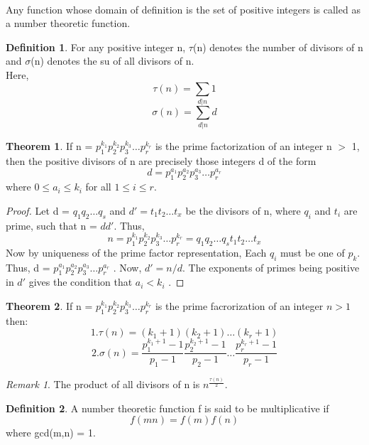 \documentclass[15,a4paper]{report}
\theoremstyle{definition}
\newtheorem{definition}{Definition}[section]
\newtheorem{theorem}{Theorem}[section]
\theoremstyle{remark}
\newtheorem*{remark}{Remark}
\begin{document}
        \paragraph{} Any function whose domain of definition is the set of positive integers is called as a number theoretic function. 
        \begin{definition}
            For any positive integer n, $\tau$(n) denotes the number of divisors of n and $\sigma$(n) denotes the su of all divisors of n.\\
            Here,
            \[ \tau(n) = \sum_{d|n} 1 \]
            \[ \sigma(n) = \sum_{d|n} d \]
        \end{definition}
        \begin{theorem}
            If n = $p_1^{k_1} p_2^{k_2} p_3^{k_3} \dots p_r^{k_r}$ is the prime factorization of an integer n $>$ 1, then the positive divisors of n are precisely those integers d of the form \[ d = p_1^{a_1} p_2^{a_2} p_3^{a_3} \dots p_r^{a_r} \] 
            where $0 \leq a_i \leq k_i$ for all $1 \leq i \leq r$.
        \end{theorem}
            \begin{proof}
                Let d = $q_1 q_2 \dots q_s$ and $d' = t_1 t_2 \dots t_x$ be the divisors of n, where $q_i$ and $t_i $ are prime, such that n = $dd'$. Thus, \[ n = p_1^{k_1} p_2^{k_2} p_3^{k_3} \dots p_r^{k_r} = q_1 q_2 \dots q_s t_1 t_2 \dots t_x \]
                Now by uniqueness of the prime factor representation,  Each $q_i$ must be one of $p_k$. Thus, d = $p_1^{a_1} p_2^{a_2} p_3^{a_3} \dots p_r^{a_r}$ . Now, $d' = n/d$. The exponents of primes being positive in $d'$ gives the condition that $a_i < k_i$ .
            \end{proof}
        \begin{theorem}
            If n = $p_1^{k_1} p_2^{k_2} p_3^{k_3} \dots p_r^{k_r}$ is the prime facrorization of an integer $n>1$ then:
            \[ 1. \tau(n) = (k_1 +1)(k_2 +1)\dots(k_r +1)\]
            \[ 2. \sigma(n) = \frac{p_1^{k_1 +1}-1}{p_1 -1}  \frac{p_2^{k_2 +1}-1}{p_2 -1} \dots  \frac{p_r^{k_r +1}-1}{p_r -1} \]
        \end{theorem}    
        \begin{remark}
             The product of all divisors of n is $n^{\frac{\tau(n)}{2}}$.
        \end{remark}
        \begin{definition}
            A number theoretic function f is said to be multiplicative if \[f(mn) = f(m)f(n)\]
            where gcd(m,n) = 1.
        \end{definition}
\end{document}
